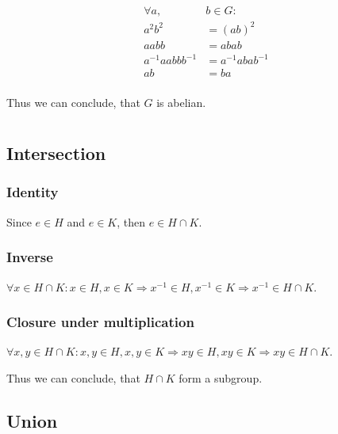 \documentclass[a4paper]{article}
\begin{document}
\thispagestyle{fancy} %
{}

\section{}
\begin{align*}
	\forall a, &b \in G: \\
	a^2b^2 &= (ab)^2 \\
	aabb &= abab \\
	a^{-1}aabbb^{-1} &= a^{-1}abab^{-1} \\
	ab &= ba \\
\end{align*}

Thus we can conclude, that $G$ is abelian.

\section{}

\subsection*{Intersection}

\subsubsection*{Identity}

Since $e \in H$ and $e \in K$, then $e \in H \cap K$.

\subsubsection*{Inverse}

$\forall x \in H \cap K: x \in H, x \in K \Rightarrow x^{-1} \in H, x^{-1} \in K \Rightarrow x^{-1} \in H \cap K$.

\subsubsection*{Closure under multiplication}

$\forall x,y \in H \cap K: x,y \in H, x,y \in K \Rightarrow xy \in H, xy \in K \Rightarrow xy \in H \cap K$.


Thus we can conclude, that $H\cap K$ form a subgroup.

\subsection*{Union}
\end{document}
